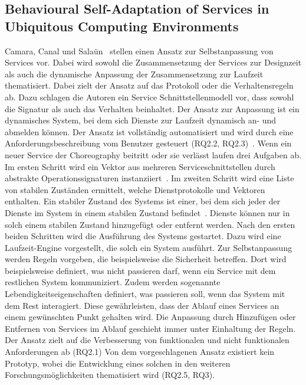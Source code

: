 \documentclass[conference,compsoc,ngerman]{IEEEtran}
\begin{document}
\subsection{Behavioural Self-Adaptation of Services in Ubiquitous Computing Environments}
Camara, Canal und Salaün~\cite{camara2009behavioural} stellen einen Ansatz zur Selbstanpassung von Services vor. Dabei wird sowohl die Zusammensetzung der Services zur Designzeit als auch die dynamische Anpassung der Zusammensetzung zur Laufzeit thematisiert.
Dabei zielt der Ansatz auf das Protokoll oder die Verhaltensregeln ab. Dazu schlagen die Autoren ein Service Schnittstellenmodell vor, dass sowohl die Signatur als auch das Verhalten beinhaltet.
Der Ansatz zur Anpassung ist ein dynamisches System, bei dem sich Dienste zur Laufzeit dynamisch an- und abmelden können. Der Ansatz ist vollständig automatisiert und wird durch eine Anforderungsbeschreibung vom Benutzer gesteuert (RQ2.2, RQ2.3)~\cite{camara2009behavioural}. Wenn ein neuer Service der Choreography beitritt oder sie verlässt laufen drei Aufgaben ab. Im ersten Schritt wird ein Vektor aus mehreren Serviceschnittstellen durch abstrakte Operationssignaturen instanziiert~\cite{camara2009behavioural}. Im zweiten Schritt wird eine Liste von stabilen Zuständen ermittelt, welche Dienstprotokolle und Vektoren enthalten. Ein stabiler Zustand des Systems ist einer, bei dem sich jeder der Dienste im System in einem stabilen Zustand befindet~\cite{camara2009behavioural}. Dienste können nur in solch einem stabilen Zustand hinzugefügt oder entfernt werden. Nach den ersten beiden Schritten wird die Ausführung des Systems gestartet. Dazu wird eine Laufzeit-Engine vorgestellt, die solch ein System ausführt.
Zur Selbstanpassung werden Regeln vorgeben, die beispielsweise die Sicherheit betreffen. Dort wird beispielsweise definiert, was nicht passieren darf, wenn ein Service mit dem restlichen System kommuniziert.
Zudem werden sogenannte Lebendigkeitseigenschaften definiert, was passieren soll, wenn das System mit dem Rest interagiert. Diese gewährleisten, dass der Ablauf eines Services an einem gewünschten Punkt gehalten wird. Die Anpassung durch Hinzufügen oder Entfernen von Services im Ablauf geschieht immer unter Einhaltung der Regeln.
Der Ansatz zielt auf die Verbesserung von funktionalen und nicht funktionalen Anforderungen ab (RQ2.1)
Von dem vorgeschlagenen Ansatz existiert kein Prototyp, wobei die Entwicklung eines solchen in den weiteren Forschungsmöglichkeiten thematisiert wird (RQ2.5, RQ3).
\end{document}
